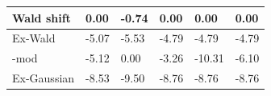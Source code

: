 \begin{tabular}{|l|l|l|l|l|l|}
\hline
Wald shift&0.00&-0.74&0.00&0.00&0.00\\\hline
Ex-Wald&-5.07&-5.53&-4.79&-4.79&-4.79\\\hline
\rocdd{}-mod&-5.12&0.00&-3.26&-10.31&-6.10\\\hline
Ex-Gaussian&-8.53&-9.50&-8.76&-8.76&-8.76\\\hline
\end{tabular}
